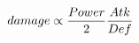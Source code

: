 \documentclass[preview]{standalone}
\begin{document}
\begin{align*}
\special{dvisvgm:raw <g id='unique000'>}damage \propto \frac{Power}{2}\frac{Atk}{Def}\special{dvisvgm:raw </g>}
\end{align*}
\end{document}

